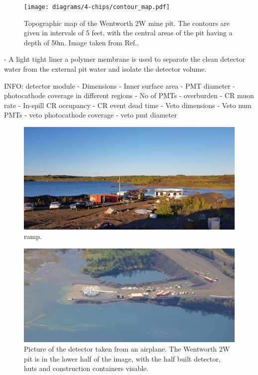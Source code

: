 \begin{figure} %
    \texttt{[image: diagrams/4-chips/contour\_map.pdf]}
    \caption[Topographic map of the Wentworth 2W mine pit.]
    {Topographic map of the Wentworth 2W mine pit. The contours are given in intervals of 5 feet,
        with the central areas of the pit having a depth of 50m. Image taken from
        Ref.\cite{adamson2013}.}
    \label{fig:contour_map}
\end{figure}

- A light tight liner a polymer membrane is used to separate the clean detector water from the
external pit water and isolate the detector volume.

INFO: detector module
- Dimensions
- Inner surface area
- PMT diameter
- photocathode coverage in different regions
- No of PMTs
- overburden
- CR muon rate
- In-spill CR occupancy
- CR event dead time
- Veto dimensions
- Veto num PMTs
- veto photocathode coverage
- veto pmt diameter

\begin{figure} %
    \includegraphics[width=\textwidth]{diagrams/4-chips/ramp.jpg}
    \caption[ramp.]
    {ramp.}
    \label{fig:ramp}
\end{figure}

\begin{figure} %
    \includegraphics[width=\textwidth]{diagrams/4-chips/from_the_sky.jpg}
    \caption[Picture of the \chips detector from the air.]
    {Picture of the \chips detector taken from an airplane. The Wentworth 2W pit is in the lower
        half of the image, with the half built detector, huts and construction containers
        visable.}
    \label{fig:from_the_sky}
\end{figure}

